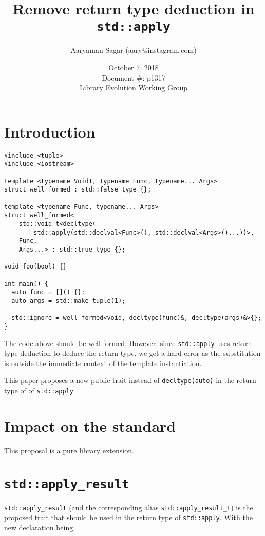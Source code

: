 \documentclass{article}
\begin{document}
\title{\textbf{Remove return type deduction in \texttt{std::apply}}}
\author{Aaryaman Sagar (aary@instagram.com)}
\date{October 7, 2018 \\ Document \#: p1317 \\ Library Evolution Working Group}
\maketitle

\section{Introduction}

\begin{lstlisting}
#include <tuple>
#include <iostream>

template <typename VoidT, typename Func, typename... Args>
struct well_formed : std::false_type {};

template <typename Func, typename... Args>
struct well_formed<
    std::void_t<decltype(
        std::apply(std::declval<Func>(), std::declval<Args>()...))>,
    Func,
    Args...> : std::true_type {};

void foo(bool) {}

int main() {
  auto func = []() {};
  auto args = std::make_tuple(1);

  std::ignore = well_formed<void, decltype(func)&, decltype(args)&>{};
}
\end{lstlisting}

The code above should be well formed.  However, since \texttt{std::apply} uses
return type deduction to deduce the return type, we get a hard error as the
substitution is outside the immediate context of the template instantiation.

This paper proposes a new public trait instead of \texttt{decltype(auto)} in
the return type of of \texttt{std::apply}

\section{Impact on the standard}
This proposal is a pure library extension.

\section{\texttt{std::apply\_result}}
\texttt{std::apply\_result} (and the corresponding alias
\texttt{std::apply\_result\_t}) is the proposed trait that should be used in
the return type of \texttt{std::apply}.  With the new declaration being
\end{document}
